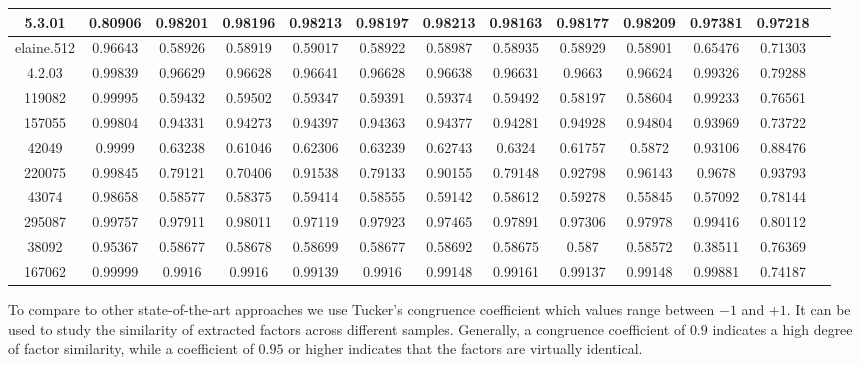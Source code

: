 \begin{table}[t]
\begin{center}
\begin{small}
\begin{sc}
{\begin{tabular}{ c c c c c c c c c  c  c  c  c }
5.3.01 & 0.80906  &  0.98201  &  0.98196  &  0.98213  &  0.98197  &  0.98213  &  0.98163  &  0.98177  &  0.98209  &  0.97381  &  0.97218  \\ \hline
elaine.512 & 0.96643  &  0.58926  &  0.58919  &  0.59017  &  0.58922  &  0.58987  &  0.58935  &  0.58929  &  0.58901  &  0.65476  &  0.71303  \\
4.2.03 & 0.99839  &  0.96629  &  0.96628  &  0.96641  &  0.96628  &  0.96638  &  0.96631  &  0.9663  &  0.96624  &  0.99326  &  0.79288  \\ \hline
119082 & 0.99995  &  0.59432  &  0.59502  &  0.59347  &  0.59391  &  0.59374  &  0.59492  &  0.58197  &  0.58604  &  0.99233  &  0.76561  \\
157055 & 0.99804  &  0.94331  &  0.94273  &  0.94397  &  0.94363  &  0.94377  &  0.94281  &  0.94928  &  0.94804  &  0.93969  &  0.73722  \\ \hline
42049 & 0.9999  &  0.63238  &  0.61046  &  0.62306  &  0.63239  &  0.62743  &  0.6324  &  0.61757  &  0.5872  &  0.93106  &  0.88476  \\
220075 & 0.99845  &  0.79121  &  0.70406  &  0.91538  &  0.79133  &  0.90155  &  0.79148  &  0.92798  &  0.96143  &  0.9678  &  0.93793  \\ \hline
43074 & 0.98658  &  0.58577  &  0.58375  &  0.59414  &  0.58555  &  0.59142  &  0.58612  &  0.59278  &  0.55845  &  0.57092  &  0.78144  \\
295087 & 0.99757  &  0.97911  &  0.98011  &  0.97119  &  0.97923  &  0.97465  &  0.97891  &  0.97306  &  0.97978  &  0.99416  &  0.80112  \\ \hline
38092 & 0.95367  &  0.58677  &  0.58678  &  0.58699  &  0.58677  &  0.58692  &  0.58675  &  0.587  &  0.58572  &  0.38511  &  0.76369  \\
167062 & 0.99999  &  0.9916  &  0.9916  &  0.99139  &  0.9916  &  0.99148  &  0.99161  &  0.99137  &  0.99148  &  0.99881  &  0.74187  \\ \hline
\end{tabular}
}
\end{sc}
\end{small}
\end{center}
\vskip -0.1in
\end{table}




To compare \ICA{} to other state-of-the-art approaches we use 
Tucker's congruence coefficient \cite{lorenzo2006tucker} which values range between $-1$ and $+1$. It can be used to study the similarity of extracted factors across different samples. Generally, a congruence coefficient of $0.9$ indicates a high degree of factor similarity, while a coefficient of $0.95$ or higher indicates that the factors are virtually identical. 

